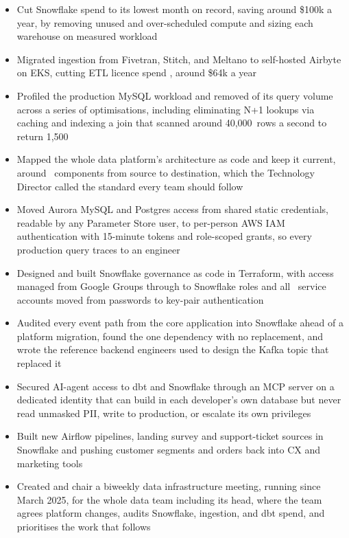 \documentclass[10pt,a4paper,withhyper,ragged2e]{altacv}
\begin{document}
\begin{itemize}
  \item Cut Snowflake spend  to its lowest month on record, saving around \$100k a
        year, by removing unused and over-scheduled compute and sizing each warehouse on measured
        workload
  \item Migrated ingestion from Fivetran, Stitch, and Meltano to self-hosted Airbyte on EKS,
        cutting ETL licence spend , around \$64k a year
  \item Profiled the production MySQL workload and removed  of its query volume
        across a series of optimisations, including eliminating N+1 lookups via caching and
        indexing a join that scanned around 40,000~rows a second to return 1,500
  \item Mapped the whole data platform's architecture as code and keep it current, around
        ~components from source to destination, which the Technology Director called
        the standard every team should follow
  \item Moved Aurora MySQL and Postgres access from shared static credentials, readable by any
        Parameter Store user, to per-person AWS IAM authentication with 15-minute tokens and
        role-scoped grants, so every production query traces to an engineer
  \item Designed and built Snowflake governance as code in Terraform, with access managed from
        Google Groups through to Snowflake roles and all ~service accounts moved from
        passwords to key-pair authentication
  \item Audited every event path from the core application into Snowflake ahead of a platform
        migration, found the one dependency with no replacement, and wrote the reference backend
        engineers used to design the Kafka topic that replaced it
  \item Secured AI-agent access to dbt and Snowflake through an MCP server on a dedicated identity
        that can build in each developer's own database but never read unmasked PII, write to
        production, or escalate its own privileges
  \item Built  new Airflow pipelines, landing survey and support-ticket sources in
        Snowflake and pushing customer segments and orders back into CX and marketing tools
  \item Created and chair a biweekly data infrastructure meeting, running since March 2025, for the
        whole data team including its head, where the team agrees platform changes, audits
        Snowflake, ingestion, and dbt spend, and prioritises the work that follows
\end{itemize}
\end{document}
